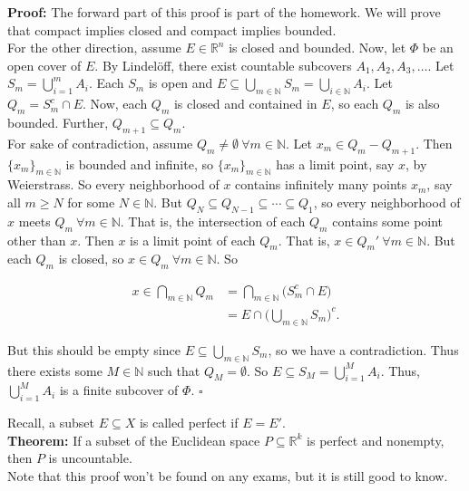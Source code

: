 \documentclass{article}
\begin{document}
\textbf{Proof:} The forward part of this proof is part of the homework. We will prove that compact implies closed and compact implies bounded.\\

For the other direction, assume $E \in \mathbb{R}^n$ is closed and bounded. Now, let $\Phi$ be an open cover of $E$. By Lindel\"off, there exist countable subcovers $A_1, A_2, A_3, \dots$. Let $S_m = \bigcup_{i=1}^m A_i$. Each $S_m$ is open and $E \subseteq \bigcup_{m \in \mathbb{N}}S_m = \bigcup_{i \in \mathbb{N}}A_i$. Let $Q_m = S_m^c \cap E$. Now, each $Q_m$ is closed and contained in $E$, so each $Q_m$ is also bounded. Further, $Q_{m+1} \subseteq Q_m$.\\

For sake of contradiction, assume $Q_m \neq \emptyset \ \forall m \in \mathbb{N}$. Let $x_m \in Q_m-Q_{m+1}$. Then $\{x_m\}_{m \in \mathbb{N}}$ is bounded and infinite, so $\{x_m\}_{m \in \mathbb{N}}$ has a limit point, say $x$, by Weierstrass. So every neighborhood of $x$ contains infinitely many points $x_m$, say all $m \geq N$ for some $N \in \mathbb{N}$. But $Q_N \subseteq Q_{N-1} \subseteq \cdots \subseteq Q_1$, so every neighborhood of $x$ meets $Q_m \ \forall m \in \mathbb{N}$. That is, the intersection of each $Q_m$  contains some point other than $x$. Then $x$ is a limit point of each $Q_m$. That is, $x \in Q_m' \ \forall m \in \mathbb{N}$. But each $Q_m$ is closed, so $x \in Q_m \ \forall m \in \mathbb{N}$. So

\begin{align*}
    x \in \bigcap_{m \in \mathbb{N}}Q_m &= \bigcap_{m \in \mathbb{N}} \bigl(S_m^c \cap E \bigr)\\
    &= E \cap \biggl( \bigcup_{m \in \mathbb{N}} S_m\biggr)^c.
\end{align*}

But this should be empty since $E \subseteq \bigcup_{m \in \mathbb{N}} S_m$, so we have a contradiction. Thus there exists some $M \in \mathbb{N}$ such that $Q_M = \emptyset$. So $E \subseteq S_M = \bigcup_{i=1}^MA_i$. Thus, $\bigcup_{i=1}^MA_i$ is a finite subcover of $\Phi$. $\square$

Recall, a subset $E \subseteq X$ is called perfect if $E= E'$.\\

\textbf{Theorem:} If a subset of the Euclidean space $P \subseteq \mathbb{R}^k$ is perfect and nonempty, then $P$ is uncountable.\\

Note that this proof won't be found on any exams, but it is still good to know.\\
\end{document}
